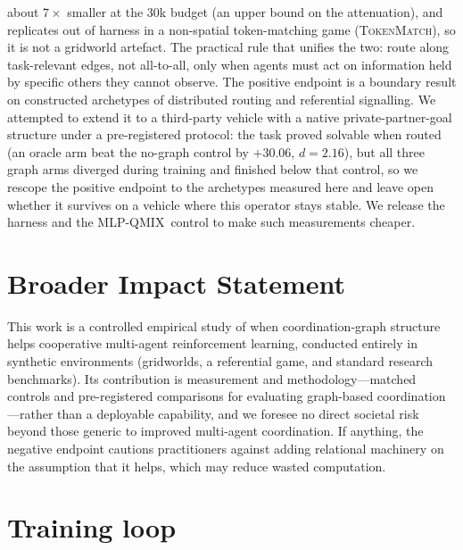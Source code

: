 \documentclass[10pt]{article}
\newcommand{\algoname}[1]{\textsc{#1}}
\newcommand{\mlpqmix}{\algoname{MLP-QMIX}}
\newcommand{\SCnbrShrink}{7}          %
\newcommand{\tokenmatch}{\textsc{TokenMatch}}
\newcommand{\PDoracleGap}{+30.06}      %
\newcommand{\PDoracleD}{2.16}
\begin{document}
about $\SCnbrShrink\times$ smaller at the 30k budget (an upper bound on the
attenuation), and replicates out of harness in a
non-spatial token-matching game (\tokenmatch), so it is not a gridworld
artefact. The practical rule that unifies the two: route along task-relevant
edges, not all-to-all, only when agents must act on information held by
specific others they cannot observe. The positive endpoint is a boundary
result on constructed archetypes of distributed routing and referential
signalling. We attempted to extend it to a third-party vehicle with a native
private-partner-goal structure under a pre-registered protocol: the task proved
solvable when routed (an oracle arm beat the no-graph control by
$\PDoracleGap$, $d{=}\PDoracleD$), but all three graph arms diverged during
training and finished below that control, so we rescope the positive endpoint
to the archetypes measured here and leave open whether it survives on a vehicle
where this operator stays stable. We release the harness and the \mlpqmix\
control to make such measurements cheaper.

\section*{Broader Impact Statement}

This work is a controlled empirical study of when coordination-graph
structure helps cooperative multi-agent reinforcement learning, conducted
entirely in synthetic environments (gridworlds, a referential game, and
standard research benchmarks). Its contribution is measurement and
methodology---matched controls and pre-registered comparisons for evaluating
graph-based coordination---rather than a deployable capability, and we
foresee no direct societal risk beyond those generic to improved multi-agent
coordination. If anything, the negative endpoint cautions practitioners
against adding relational machinery on the assumption that it helps, which
may reduce wasted computation.




\appendix

\section{Training loop}
\label{app:trainloop}
\end{document}
